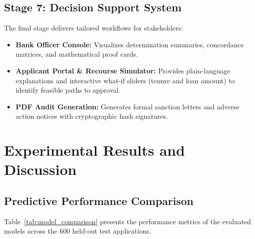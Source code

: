 \documentclass[conference]{IEEEtran}
\begin{document}
\subsection{Stage 7: Decision Support System}
The final stage delivers tailored workflows for stakeholders:
\begin{itemize}
    \item \textbf{Bank Officer Console:} Visualizes determination summaries, concordance matrices, and mathematical proof cards.
    \item \textbf{Applicant Portal \& Recourse Simulator:} Provides plain-language explanations and interactive what-if sliders (tenure and loan amount) to identify feasible paths to approval.
    \item \textbf{PDF Audit Generation:} Generates formal sanction letters and adverse action notices with cryptographic hash signatures.
\end{itemize}

\section{Experimental Results and Discussion}

\subsection{Predictive Performance Comparison}
Table~\ref{tab:model_comparison} presents the performance metrics of the evaluated models across the 600 held-out test applications.

\begin{table}[htbp]
\caption{Model Performance Comparison on Held-Out Test Set ($N=600$)}
\label{tab:model_comparison}
\centering
{}
\end{table}
\end{document}

